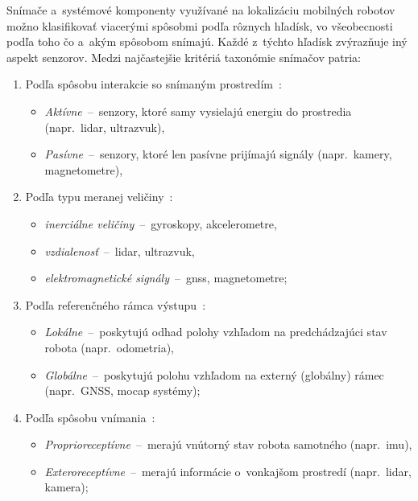   Snímače a~systémové komponenty využívané na lokalizáciu mobilných robotov možno klasifikovať viacerými spôsobmi podľa rôznych hľadísk, vo všeobecnosti podľa toho čo a~akým spôsobom snímajú. Každé z~týchto hľadísk zvýrazňuje iný aspekt senzorov. Medzi najčastejšie kritériá taxonómie snímačov patria:

\begin{enumerate}
  \item Podľa spôsobu interakcie so snímaným prostredím~\cite{christensenSensingEstimation2016}:
  \begin{itemize}
    \item \emph{Aktívne}~--~senzory, ktoré samy vysielajú energiu do prostredia (napr.\ \acrshort{lidar}, ultrazvuk),
    \item \emph{Pasívne}~--~senzory, ktoré len pasívne prijímajú signály (napr.\ kamery, magnetometre),
  \end{itemize}

  \item Podľa typu meranej veličiny~\autocite{siegwartIntroductionAutonomousMobile2011,thrunProbabilisticRobotics2005}:
  \begin{itemize}
    \item \emph{inerciálne veličiny}~--~gyroskopy, akcelerometre,
    \item \emph{vzdialenosť}~--~\acrshort{lidar}, ultrazvuk,
    \item \emph{elektromagnetické signály}~--~\acrshort{gnss}, magnetometre;
  \end{itemize}
  
  \item Podľa referenčného rámca výstupu~\cite{inproceedings}:
  \begin{itemize}
    \item \emph{Lokálne}~--~poskytujú odhad polohy vzhľadom na predchádzajúci stav robota (napr.\ odometria),
    \item \emph{Globálne}~--~poskytujú polohu vzhľadom na externý (globálny) rámec (napr.\ GNSS, \acrshort{mocap} systémy);
  \end{itemize}
  
  \item Podľa spôsobu vnímania~\cite{siegwartIntroductionAutonomousMobile2011}:
  \begin{itemize}
    \item \emph{Proprioreceptívne}~--~merajú vnútorný stav robota samotného (napr.\ \acrshort{imu}),
    \item \emph{Exteroreceptívne}~--~merajú informácie o~vonkajšom prostredí (napr.\ \acrshort{lidar}, kamera);
  \end{itemize}
  

\end{enumerate}
